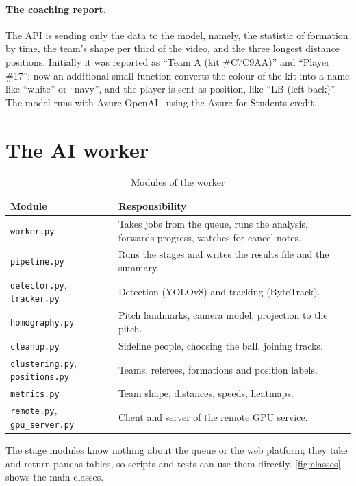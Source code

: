\paragraph{The coaching report.} The API is sending only the data to the model, namely, the statistic of formation by time, the team's shape per third of the video, and the three longest distance positions. Initially it was reported as ``Team A (kit \#C7C9AA)'' and ``Player \#17''; now an additional small function converts the colour of the kit into a name like ``white'' or ``navy'', and the player is sent as position, like ``LB (left back)''. The model runs with Azure OpenAI~\cite{azureopenai} using the Azure for Students credit.

\section{The AI worker}

\begin{table}[H]
	\centering
	\begin{tabular}{|p{}|p{}|}
		\hline
		\textbf{Module} & \textbf{Responsibility} \\
		\hline
		\texttt{worker.py} & Takes jobs from the queue, runs the analysis, forwards progress, watches for cancel notes. \\
		\hline
		\texttt{pipeline.py} & Runs the stages and writes the results file and the summary. \\
		\hline
		\texttt{detector.py}, \texttt{tracker.py} & Detection (YOLOv8) and tracking (ByteTrack). \\
		\hline
		\texttt{homography.py} & Pitch landmarks, camera model, projection to the pitch. \\
		\hline
		\texttt{cleanup.py} & Sideline people, choosing the ball, joining tracks. \\
		\hline
		\texttt{clustering.py}, \texttt{positions.py} & Teams, referees, formations and position labels. \\
		\hline
		\texttt{metrics.py} & Team shape, distances, speeds, heatmaps. \\
		\hline
		\texttt{remote.py}, \texttt{gpu\_\allowbreak{}server.\allowbreak{}py} & Client and server of the remote GPU service. \\
		\hline
	\end{tabular}
	\caption{Modules of the worker}
	\label{tab:worker-modules}
\end{table}

The stage modules know nothing about the queue or the web platform; they take and return pandas tables, so scripts and tests can use them directly. \autoref{fig:classes} shows the main classes.

